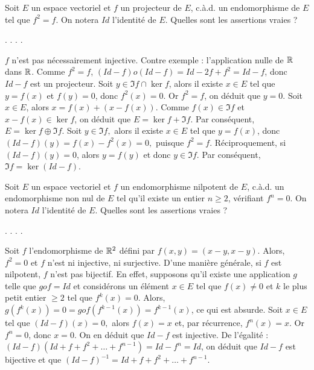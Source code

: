 \begin{question}
Soit $E$ un espace vectoriel et $f$ un projecteur de $E$, c.à.d. un endomorphisme de $E$ tel que $f^2=f$. On notera $Id$ l'identité de $E$. Quelles sont les assertions vraies ?
\begin{answers}  
.
.
.
.
\end{answers}
\begin{explanations} $f$ n'est pas nécessairement injective. Contre exemple : l'application nulle de $\mathbb{R} $ dans $ \mathbb{R}$.
\vskip0mm
Comme $f^2=f$, $(Id - f)o(Id - f)=Id - 2f+f^2= Id - f$, donc $Id - f$ est un projecteur.
\vskip0mm
Soit $y\in  \Im f \cap \ker f$, alors il existe $x\in E$ tel que $y=f(x)$ et $f(y)=0$, donc $f^2(x)=0$. Or $f^2=f$, on déduit que $y=0$.
\vskip0mm
Soit $x\in E$, alors $x= f(x) + (x-f(x))$. Comme $f(x)\in\Im f$ et $x-f(x)\in\ker f$, on déduit que $E=\ker f+\Im f $. Par conséquent,   $E=\ker f \oplus \Im f$.
\vskip0mm
Soit $y\in\Im f,$  alors il existe $x\in E$ tel que $y=f(x)$, donc $(Id-f)(y)=f(x)-f^2(x)=0,$ puisque $f^2=f$. Réciproquement, si $(Id - f)(y)=0$, alors $y=f(y)$ et donc $y\in \Im f$. Par conséquent,  $ \Im f =\ker (Id - f) $.
\end{explanations}
\end{question}

\begin{question}
Soit $E$ un espace vectoriel et $f$ un endomorphisme nilpotent de $E$, c.à.d. un endomorphisme non nul de $E$ tel qu'il existe un entier $n\ge 2$, vérifiant  $f^n=0$. On notera $Id$ l'identité de $E$. Quelles sont les assertions vraies ?
\begin{answers}  
.
.
.
.
\end{answers}
\begin{explanations} Soit $f$ l'endomorphisme de $\mathbb{R}^2$ défini par $f(x,y)=(x-y,x-y)$. Alors, $f^2=0$ et $f$ n'est ni injective, ni surjective.
\vskip0mm
D'une manière générale, si $f$ est nilpotent, $f$ n'est pas bijectif. En effet, supposons qu'il existe une application $g$ telle que $gof=Id$ et considérons un élément $x\in E$ tel que $f(x)\neq 0$ et $k$ le plus petit entier $\ge 2$ tel que $f^k(x)=0$. Alors, $g(f^k(x))=0=gof(f^{k-1}(x)) = f^{k-1}(x)$, ce qui est absurde.
\vskip0mm
Soit $x\in E$ tel que $(Id-f)(x)=0,$ alors $f(x)=x$ et, par récurrence, $f^n(x)=x$. Or $f^n=0$, donc $x=0$. On en déduit que  $Id-f$ est injective.
\vskip0mm
De l'égalité : $(Id-f)(Id+f+f^2+\dots + f^{n-1})=Id-f^n=Id$, on déduit que $Id-f$ est bijective et que $(Id-f)^{-1}=Id+f+f^2+\dots + f^{n-1}$.
\end{explanations}
\end{question}

